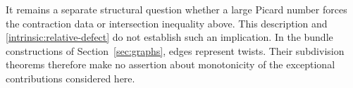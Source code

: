 It remains a separate structural question whether a large Picard
number forces the contraction data or intersection inequality above.
This description and \eqref{intrinsic:relative-defect} do not establish
such an implication. In the bundle constructions of
Section~\ref{sec:graphs}, edges represent twists. Their subdivision
theorems therefore make no assertion about monotonicity of the
exceptional contributions considered here.
